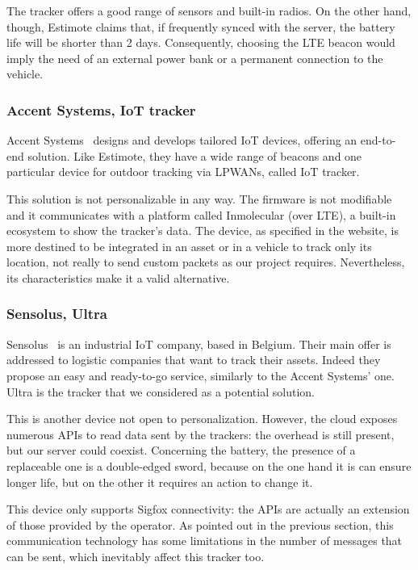 The tracker offers a good range of sensors and built-in radios. On the other hand, though, Estimote claims that, if frequently synced with the server, the battery life will be shorter than 2 days. Consequently, choosing the LTE beacon would imply the need of an external power bank or a permanent connection to the vehicle.

\subsubsection{Accent Systems, IoT tracker}
Accent Systems~\cite{accentsys} designs and develops tailored IoT devices, offering an end-to-end solution. Like Estimote, they have a wide range of beacons and one particular device for outdoor tracking via LPWANs, called IoT tracker.

This solution is not personalizable in any way. The firmware is not modifiable and it communicates with a platform called Inmolecular (over LTE), a built-in ecosystem to show the tracker's data. The device, as specified in the website, is more destined to be integrated in an asset or in a vehicle to track only its location, not really to send custom packets as our project requires. Nevertheless, its characteristics make it a valid alternative.

\subsubsection{Sensolus, Ultra}
Sensolus~\cite{sensolus} is an industrial IoT company, based in Belgium. Their main offer is addressed to logistic companies that want to track their assets. Indeed they propose an easy and ready-to-go service, similarly to the Accent Systems' one. Ultra is the tracker that we considered as a potential solution.

This is another device not open to personalization. However, the cloud exposes numerous APIs to read data sent by the trackers: the overhead is still present, but our server could coexist. Concerning the battery, the presence of a replaceable one is a double-edged sword, because on the one hand it is can ensure longer life, but on the other it requires an action to change it.

This device only supports Sigfox connectivity: the APIs are actually an extension of those provided by the operator. As pointed out in the previous section, this communication technology has some limitations in the number of messages that can be sent, which inevitably affect this tracker too.


